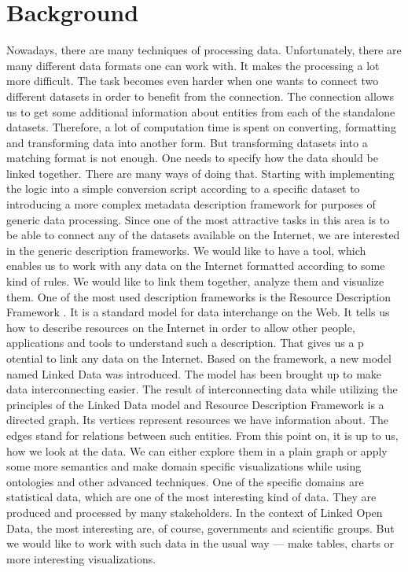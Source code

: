 \documentclass[a4paper,12pt,oneside]{report}
\begin{document}
\section{Background}
{Nowadays, there are many techniques of processing data. Unfortunately, there are many different data formats one can work with. It makes the processing a lot
more difficult. The task becomes even harder when one wants to connect two different datasets in order to benefit from the connection. The connection allows
us to get some additional information about entities from each of the standalone datasets. Therefore, a lot of computation time is spent on converting, formatting and transforming data into another form. But transforming datasets into
a matching format is not enough. One needs to specify how the data should be linked together.
There are many ways of doing that. Starting with implementing the logic into a simple conversion script according to a specific dataset to introducing
a more complex metadata description framework for purposes of generic data processing. Since one of the most attractive tasks in this area is to be able to connect
any of the datasets available on the Internet, we are interested in the generic description frameworks. We would like to have a tool, which enables us to work with
any data on the Internet formatted according to some kind of rules. We would like to link them together, analyze them and visualize them.
One of the most used description frameworks is the Resource Description Framework . It is a standard model for data interchange on the Web. It tells
us how to describe resources on the Internet in order to allow other people, applications and tools to understand such a description. That gives us a p otential
to link any data on the Internet. Based on the framework, a new model named Linked Data was introduced. The model has been brought up to make data interconnecting easier.
The result of interconnecting data while utilizing the principles of the Linked
Data model and Resource Description Framework is a directed graph. Its vertices represent resources we have information about. The edges stand for relations between such entities. From this point on, it is up to us, how we look
at the data. We can either explore them in a plain graph or apply some more semantics and make domain specific visualizations while using ontologies and other
advanced techniques.
One of the specific domains are statistical data, which are one of the most interesting kind of data. They are produced and processed by many stakeholders. In the context of Linked Open Data, the most interesting are, of course,
governments and scientific groups. But we would like to work with such data in the usual way — make tables, charts or more interesting visualizations. }
\end{document}
